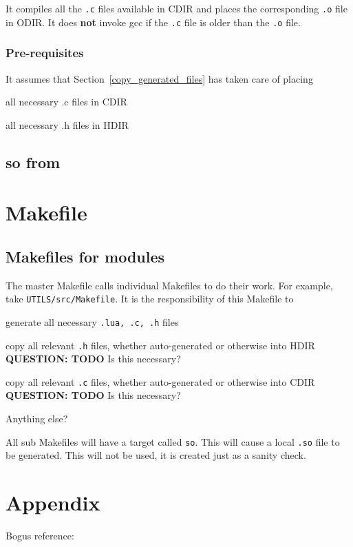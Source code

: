 It compiles all the {\tt .c} files available in CDIR and places 
the corresponding {\tt .o} file in ODIR. It does {\bf not} invoke gcc if the {\tt.c}
file is older than the {\tt .o} file. 


\subsubsection{Pre-requisites}
It assumes that Section~\ref{copy_generated_files} has taken care of placing
\be
\item all necessary .c files in CDIR
\item all necessary .h files in HDIR
\ee

\subsection{so from}
\label{so_from_o}
\TBC

\section{Makefile}

\subsection{Makefiles for modules}
The master Makefile calls individual Makefiles to do their work. For example,
take \verb+UTILS/src/Makefile+. It is the responsibility of this Makefile to
\be
\item generate all necessary {\tt .lua, .c, .h} files
\item copy all relevant \verb+.h+ files, whether auto-generated or otherwise
into HDIR  {\bf QUESTION: TODO } Is this necessary?
\item copy all relevant \verb+.c+ files, whether auto-generated or otherwise
into CDIR  {\bf QUESTION: TODO } Is this necessary?
\item Anything else? \TBC
\ee

All sub Makefiles will have a target called {\tt so}. This  will cause a local \verb+.so+ file to be generated. This will not be used, it is created
just as a sanity check.


\section{Appendix}

Bogus reference: \cite{sarawagi99}

 




